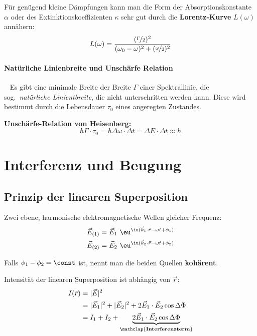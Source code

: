 		Für genügend kleine Dämpfungen kann man die Form der Absorptionskonstante $\alpha$ oder des Extinktionskoeffizienten $\kappa$ sehr gut durch die \textbf{Lorentz-Kurve} $L(\omega)$ annähern:
		\[
			L(\omega) = \frac{(\nicefrac \Gamma 2)^2}{(\omega_0 - \omega)^2 + (\nicefrac \omega 2)^2}
		\]
		
		\paragraph{Natürliche Linienbreite und Unschärfe Relation} %
			~
			Es gibt eine minimale Breite der Breite $\Gamma$ einer Spektrallinie, die sog.~\emph{natürliche Linientbreite}, die nicht unterschritten werden kann. Diese wird bestimmt durch die Lebensdauer $\tau_0$ eines angeregten Zustandes.
			
			\textbf{Unschärfe-Relation von Heisenberg:}
			\[
				\hbar\Gamma \cdot \tau_0 = \hbar\Delta\omega \cdot \Delta t = \Delta E \cdot \Delta t \approx h
			\]
\section{Interferenz und Beugung} %
	\subsection{Prinzip der linearen Superposition} %
		Zwei ebene, harmonische elektromagnetische Wellen gleicher Frequenz:
		\begin{align*}
			\vec E_{(1)} &= \vec E_1 \ \eu^{\iu (\vec k_1 \cdot \vec r - \omega t + \phi_1)} \\
			\vec E_{(2)} &= \vec E_2 \ \eu^{\iu (\vec k_2 \cdot \vec r - \omega t + \phi_2)}
		\end{align*}
		
		Falls $\phi_1 - \phi_2 = \const$ ist, nennt man die beiden Quellen \textbf{kohärent}.
		
		Intensität der linearen Superposition ist abhängig von $\vec r$:
		\begin{align*}
			I(\vec r) &= |\vec E|^2 \\
			&= |\vec E_1|^2 + |\vec E_2|^2 + 2 \vec E_1 \cdot \vec E_2 \cos \Delta \Phi \\
			&= I_1 + I_2 + \underbrace{2 \vec E_1 \cdot \vec E_2 \cos \Delta \Phi}_{\mathclap{\text{\textbf{Interferenzterm}}}}
		\end{align*}
		
